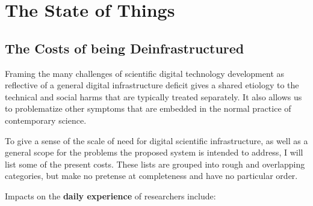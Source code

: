 \documentclass[notoc]{tufte-book}
\begin{document}
\chapter{The State of Things}


\section{The Costs of being
Deinfrastructured}





Framing the many challenges of scientific digital technology development
as reflective of a general digital infrastructure deficit gives a shared
etiology to the technical and social harms that are typically treated
separately. It also allows us to problematize other symptoms that are
embedded in the normal practice of contemporary science.

To give a sense of the scale of need for digital scientific
infrastructure, as well as a general scope for the problems the proposed
system is intended to address, I will list some of the present costs.
These lists are grouped into rough and overlapping categories, but make
no pretense at completeness and have no particular order.

Impacts on the \textbf{daily experience} of researchers include:
\end{document}
